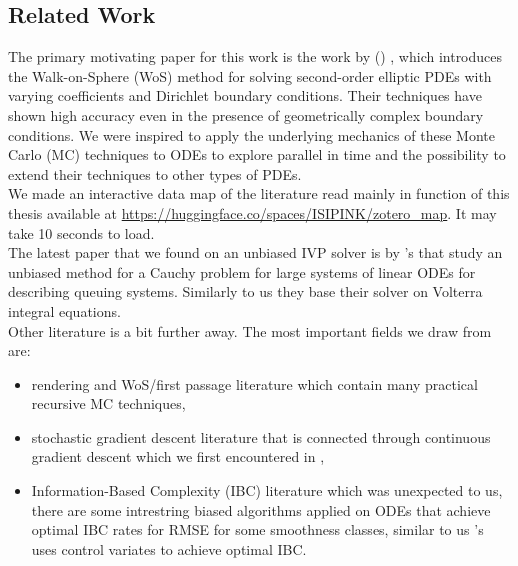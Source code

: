\documentclass[a4paper,12pt]{article}
\begin{document}
\subsection{Related Work}
The primary motivating paper for this work is the work
by \citeauthor{sawhney_grid-free_2022}
(\citeyear{sawhney_grid-free_2022}) \cite{sawhney_grid-free_2022},
which introduces the Walk-on-Sphere (WoS) method for solving second-order
elliptic PDEs with varying coefficients and Dirichlet boundary conditions.
Their techniques have shown high accuracy even in the presence of geometrically
complex boundary conditions. We were inspired to apply the underlying
mechanics of these Monte Carlo (MC) techniques to ODEs to explore
parallel in time and the possibility to extend their techniques
to other types of PDEs. \\

We made an interactive data map of the literature read
mainly in function of this thesis available at
\url{https://huggingface.co/spaces/ISIPINK/zotero_map}.
It may take 10 seconds to load. \\

The latest paper that we found on an unbiased IVP solver is by
\citeauthor{ermakov_monte_2021}'s \citeyear{ermakov_monte_2021}
\cite{ermakov_monte_2021}  that study an unbiased method for
a Cauchy problem for large systems of linear ODEs
for describing queuing systems. Similarly to us
they base their solver on Volterra integral equations.\\

Other literature is a bit further away.
The most important fields we draw from are:

\begin{itemize}
    \item rendering and WoS/first passage literature
          which contain many practical recursive
          MC techniques,

    \item  stochastic gradient descent literature
          that is connected through continuous gradient descent
          which we first encountered in \cite{huang_hybrid_2017},

    \item  Information-Based Complexity (IBC) literature which was
          unexpected to us, there are some intrestring
          biased algorithms applied on ODEs that achieve optimal
          IBC rates for RMSE for some smoothness classes, similar to us
          \citeauthor{daun_randomized_2011}'s \citeyear{daun_randomized_2011}
          \cite{daun_randomized_2011} uses control variates
          to achieve optimal IBC.
\end{itemize}
\end{document}

